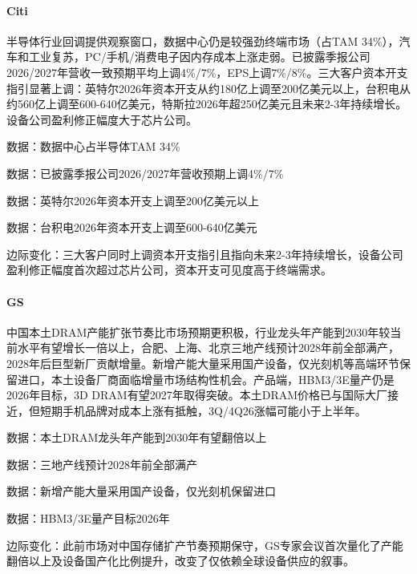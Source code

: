 \documentclass[11pt]{ctexart}
\begin{document}
\paragraph{Citi} 半导体行业回调提供观察窗口，数据中心仍是较强劲终端市场（占TAM 34\%），汽车和工业复苏，PC/手机/消费电子因内存成本上涨走弱。已披露季报公司2026/2027年营收一致预期平均上调4\%/7\%，EPS上调7\%/8\%。三大客户资本开支指引显著上调：英特尔2026年资本开支从约180亿上调至200亿美元以上，台积电从约560亿上调至600-640亿美元，特斯拉2026年超250亿美元且未来2-3年持续增长。设备公司盈利修正幅度大于芯片公司。
{\small\color{refgray}数据：数据中心占半导体TAM 34\%\par}
{\small\color{refgray}数据：已披露季报公司2026/2027年营收预期上调4\%/7\%\par}
{\small\color{refgray}数据：英特尔2026年资本开支上调至200亿美元以上\par}
{\small\color{refgray}数据：台积电2026年资本开支上调至600-640亿美元\par}
{\small\color{refgray}边际变化：三大客户同时上调资本开支指引且指向未来2-3年持续增长，设备公司盈利修正幅度首次超过芯片公司，资本开支可见度高于终端需求。\par}
\paragraph{GS} 中国本土DRAM产能扩张节奏比市场预期更积极，行业龙头年产能到2030年较当前水平有望增长一倍以上，合肥、上海、北京三地产线预计2028年前全部满产，2028年后巨型新厂贡献增量。新增产能大量采用国产设备，仅光刻机等高端环节保留进口，本土设备厂商面临增量市场结构性机会。产品端，HBM3/3E量产仍是2026年目标，3D DRAM有望2027年取得突破。本土DRAM价格已与国际大厂接近，但短期手机品牌对成本上涨有抵触，3Q/4Q26涨幅可能小于上半年。
{\small\color{refgray}数据：本土DRAM龙头年产能到2030年有望翻倍以上\par}
{\small\color{refgray}数据：三地产线预计2028年前全部满产\par}
{\small\color{refgray}数据：新增产能大量采用国产设备，仅光刻机保留进口\par}
{\small\color{refgray}数据：HBM3/3E量产目标2026年\par}
{\small\color{refgray}边际变化：此前市场对中国存储扩产节奏预期保守，GS专家会议首次量化了产能翻倍以上及设备国产化比例提升，改变了仅依赖全球设备供应的叙事。\par}
\end{document}
